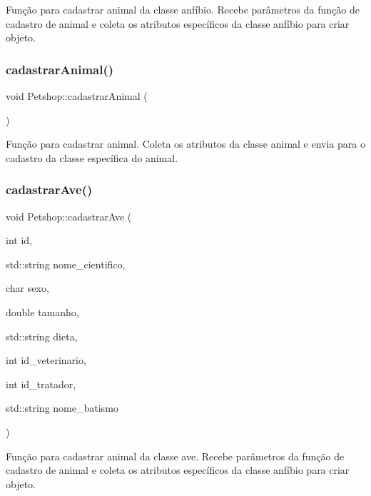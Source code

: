 Função para cadastrar animal da classe anfíbio. Recebe parâmetros da função de cadastro de animal e coleta os atributos específicos da classe anfíbio para criar objeto. \mbox{\label{classPetshop_ac06e79f236e5305d10553566095001da}} 
\subsubsection{\texorpdfstring{cadastrar\+Animal()}{cadastrarAnimal()}}
{\footnotesize\ttfamily void Petshop\+::cadastrar\+Animal (\begin{DoxyParamCaption}{ }\end{DoxyParamCaption})}

Função para cadastrar animal. Coleta os atributos da classe animal e envia para o cadastro da classe específica do animal. \mbox{\label{classPetshop_aab4d8b4855b0757cb8a76b7ffab4d6d1}} 
\subsubsection{\texorpdfstring{cadastrar\+Ave()}{cadastrarAve()}}
{\footnotesize\ttfamily void Petshop\+::cadastrar\+Ave (\begin{DoxyParamCaption}\item[{int}]{id,  }\item[{std\+::string}]{nome\+\_\+cientifico,  }\item[{char}]{sexo,  }\item[{double}]{tamanho,  }\item[{std\+::string}]{dieta,  }\item[{int}]{id\+\_\+veterinario,  }\item[{int}]{id\+\_\+tratador,  }\item[{std\+::string}]{nome\+\_\+batismo }\end{DoxyParamCaption})}

Função para cadastrar animal da classe ave. Recebe parâmetros da função de cadastro de animal e coleta os atributos específicos da classe anfíbio para criar objeto. \mbox{\label{classPetshop_a14c1c5c2ce819a4e90ed562fc9384f03}} 
